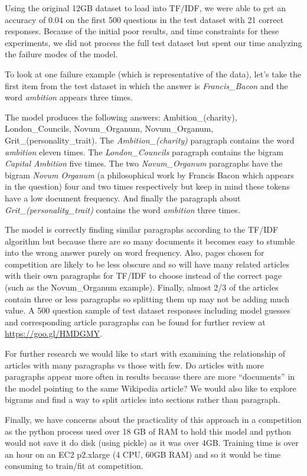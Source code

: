 \documentclass[11pt,a4paper]{article}
\begin{document}
Using the original 12GB dataset to load into \textsc{TF/IDF}, we were able to get an accuracy of 0.04 on the first 500 questions in the test dataset with 21 correct responses.  Because of the initial poor results, and time constraints for these experiments, we did not process the full test dataset but spent our time analyzing the failure modes of the model.

To look at one failure example (which is representative of the data), let’s take the first item from the test dataset in which the answer is \textit{Francis\_Bacon} and the word \textit{ambition} appears three times.

The model produces the following answers: Ambition\_(charity), London\_Councils, Novum\_Organum, Novum\_Organum, Grit\_(personality\_trait).  The \textit{Ambition\_(charity)} paragraph contains the word \textit{ambition} eleven times.  The \textit{London\_Councils} paragraph contains the bigram \textit{Capital Ambition} five times.  The two \textit{Novum\_Organum} paragraphs have the bigram \textit{Novum Organum} (a philosophical work by Francis Bacon which appears in the question) four and two times respectively but keep in mind these tokens have a low document frequency.  And finally the paragraph about \textit{Grit\_(personality\_trait)} contains the word \textit{ambition} three times.

The model is correctly finding similar paragraphs according to the \textsc{TF/IDF} algorithm but because there are so many documents it becomes easy to stumble into the wrong answer purely on word frequency.  Also, pages chosen for competition are likely to be less obscure and so will have many related articles with their own paragraphs for \textsc{TF/IDF} to choose instead of the correct page (such as the Novum\_Organum example).  Finally, almost 2/3 of the articles contain three or less paragraphs so splitting them up may not be adding much value.  A 500 question sample of test dataset responses including model guesses and corresponding article paragraphs can be found for further review at \url{https://goo.gl/HMDGMY}.

For further research we would like to start with examining the relationship of articles with many paragraphs vs those with few.  Do articles with more paragraphs appear more often in results because there are more “documents” in the model pointing to the same Wikipedia article?  We would also like to explore bigrams and find a way to split articles into sections rather than paragraph.

Finally, we have concerns about the practicality of this approach in a competition as the python process used over 18 GB of RAM to hold this model and python would not save it do disk (using pickle) as it was over 4GB.  Training time is over an hour on an EC2 p2.xlarge (4 CPU, 60GB RAM) and so it would be time consuming to train/fit at competition.
\end{document}
